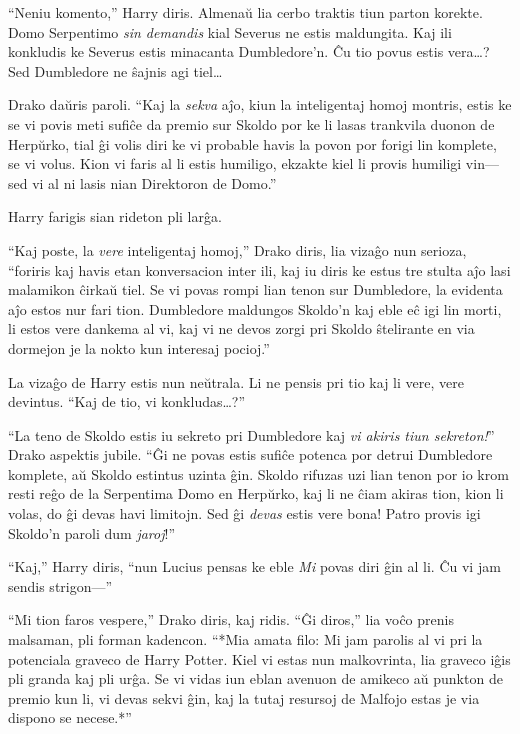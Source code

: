 ``Neniu komento,'' Harry diris. Almenaŭ lia cerbo traktis tiun parton
korekte. Domo Serpentimo \emph{sin demandis} kial Severus ne estis
maldungita. Kaj ili konkludis ke Severus estis minacanta
Dumbledore'n. Ĉu tio povus estis vera\ldots? Sed Dumbledore ne ŝajnis
agi tiel\ldots

Drako daŭris paroli. ``Kaj la \emph{sekva} aĵo, kiun la inteligentaj
homoj montris, estis ke se vi povis meti sufiĉe da premio sur Skoldo
por ke li lasas trankvila duonon de Herpŭrko, tial ĝi volis diri ke vi
probable havis la povon por forigi lin komplete, se vi volus. Kion vi
faris al li estis humiligo, ekzakte kiel li provis humiligi vin—sed vi
al ni lasis nian Direktoron de Domo.''

Harry farigis sian rideton pli larĝa.

``Kaj poste, la \emph{vere} inteligentaj homoj,'' Drako diris, lia
vizaĝo nun serioza, ``foriris kaj havis etan konversacion inter ili,
kaj iu diris ke estus tre stulta aĵo lasi malamikon ĉirkaŭ tiel. Se vi
povas rompi lian tenon sur Dumbledore, la evidenta aĵo estos nur
fari tion. Dumbledore maldungos Skoldo'n kaj eble eĉ igi lin morti, li
estos vere dankema al vi, kaj vi ne devos zorgi pri Skoldo ŝtelirante
en via dormejon je la nokto kun interesaj pocioj.''

La vizaĝo de Harry estis nun neŭtrala. Li ne pensis pri tio kaj li
vere, vere devintus. ``Kaj de tio, vi konkludas\ldots?''

``La teno de Skoldo estis iu sekreto pri Dumbledore kaj \emph{vi
akiris tiun sekreton!}'' Drako aspektis jubile. ``Ĝi ne povas estis
sufiĉe potenca por detrui Dumbledore komplete, aŭ Skoldo estintus
uzinta ĝin. Skoldo rifuzas uzi lian tenon por io krom resti reĝo de la
Serpentima Domo en Herpŭrko, kaj li ne ĉiam akiras tion, kion li
volas, do ĝi devas havi limitojn. Sed ĝi \emph{devas} estis vere bona!
Patro provis igi Skoldo'n paroli dum \emph{jaroj}!''

``Kaj,'' Harry diris, ``nun Lucius pensas ke eble \emph{Mi} povas diri
ĝin al li. Ĉu vi jam sendis strigon—''

``Mi tion faros vespere,'' Drako diris, kaj ridis. ``Ĝi diros,'' lia
voĉo prenis malsaman, pli forman kadencon. ``*Mia amata filo: Mi jam
parolis al vi pri la potenciala graveco de Harry Potter. Kiel vi estas
nun malkovrinta, lia graveco iĝis pli granda kaj pli urĝa. Se vi vidas
iun eblan avenuon de amikeco aŭ punkton de premio kun li, vi devas
sekvi ĝin, kaj la tutaj resursoj de Malfojo estas je via dispono se
necese.*''

